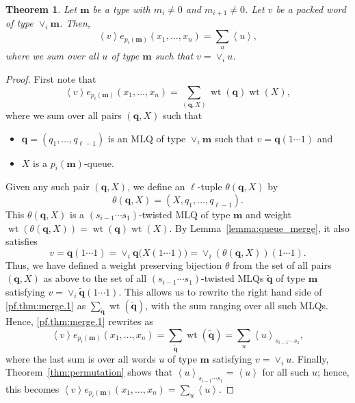 \documentclass[reqno]{amsart}
\newcommand{\0}{\phantom{c}}
\newcommand{\swt}[1]{\left\langle #1 \right\rangle} %
\newcommand{\merge}[1]{\vee_{#1}} %
\DeclareMathOperator{\wt}{wt} %
\newcommand{\mm}{\mathbf{m}}
\newcommand{\qq}{\mathbf{q}}
\let\sumnonlimits\sum
\renewcommand{\sum}{\sumnonlimits\limits}
\newcommand{\tup}[1]{\left( #1 \right)}
\theoremstyle{plain}
\newtheorem{thm}{Theorem}[section]
\theoremstyle{definition}
\numberwithin{equation}{section}
\begin{document}
\begin{thm}
\label{thm:merge}
  Let $\mm$ be a type with $m_i \neq 0$ and $m_{i+1} \neq 0$.
  Let $v$ be a packed word of type $\merge{i}\mm$.
  Then,
\[
  \swt{v} e_{p_i(\mm)}(x_1, \dotsc, x_n) = \sum_u \swt{u},
\]
where we sum over all $u$ of type $\mm$ such that $v = \merge{i} u$.
\end{thm}

\begin{proof}
  First note that
  \begin{equation}
  \swt{v} e_{p_i(\mm)}(x_1, \dotsc, x_n) = \sum_{(\qq,X)} \wt(\qq) \wt(X),
  \label{pf.thm:merge.1}
  \end{equation}
  where we sum over all pairs $(\qq, X)$ such that
  \begin{itemize}
  \item $\qq = (q_1, \dotsc, q_{\ell-1})$ is an MLQ of type $\merge{i}\mm$ such that $v = \qq(1\cdots1)$ and
  \item $X$ is a $p_i(\mm)$-queue.
  \end{itemize}
  Given any such pair $\tup{\qq, X}$, we define an
  $\ell$-tuple $\theta \tup{\qq, X}$ by
  \[
  \theta(\qq, X) = (X, q_1, \dotsc, q_{\ell-1}).
  \]
  This $\theta \tup{\qq, X}$ is a $(s_{i-1} \dotsm s_1)$-twisted MLQ of type $\mm$ and weight
  $\wt \tup{\theta \tup{\qq, X}} = \wt(\qq) \wt(X) $.
  By Lemma~\ref{lemma:queue_merge}, it also satisfies
  \[
  v = \qq(1 \dotsm 1) = \merge{i} \qq\bigl( X(1 \dotsm 1) \bigr) = \merge{i} \tup{\theta \tup{\qq, X}}(1 \dotsm 1).
  \]
  Thus, we have defined a weight preserving bijection $\theta$
  from the set of all pairs $\tup{\qq, X}$ as above
  to the set of all $(s_{i-1} \dotsm s_1)$-twisted MLQs $\widetilde{\qq}$ of type $\mm$ satisfying $v = \merge{i} \widetilde{\qq} \tup{1 \dotsm 1}$.
  This allows us to rewrite the right hand side of \eqref{pf.thm:merge.1} as
  $\sum_{\widetilde{\qq}} \wt \tup{\widetilde{\qq}}$, with the sum ranging over all such MLQs.
  Hence, \eqref{pf.thm:merge.1} rewrites as
  \[
  \swt{v} e_{p_i(\mm)}(x_1, \dotsc, x_n)
  = \sum_{\widetilde{\qq}} \wt \tup{\widetilde{\qq}}
  = \sum_u \swt{u}_{s_{i-1} \dotsm s_1} ,
  \]
  where the last sum is over all words $u$ of type $\mm$ satisfying $v = \merge{i} u$.
  Finally, Theorem~\ref{thm:permutation} shows that $\swt{u}_{s_{i-1} \dotsm s_1} = \swt{u}$ for all such $u$;
  hence, this becomes
  $\swt{v} e_{p_i(\mm)}(x_1, \dotsc, x_n) = \sum_u \swt{u}$.
\end{proof}
\end{document}
